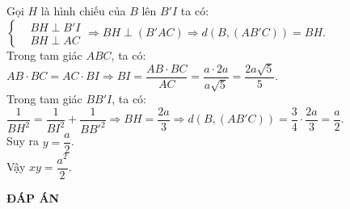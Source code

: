 \begin{ex}
{{
		}
		Gọi $H$ là hình chiếu của $B$ lên $B'I$ ta có:\\
		$\left\{\begin{aligned}& BH\perp B'I \\
		& BH\perp AC 
		\end{aligned}\right. \Rightarrow BH\perp \left(B'AC\right) \Rightarrow d\left(B,\left(AB'C\right)\right)=BH$.\\
		Trong tam giác $ABC$, ta có:\\
		$AB\cdot BC=AC\cdot BI \Rightarrow BI=\dfrac{AB\cdot BC}{AC}=\dfrac{a\cdot 2a}{a\sqrt{5}}=\dfrac{2a\sqrt{5}}{5}$.\\
		Trong tam giác $BB'I$, ta có:\\ $\dfrac{1}{BH^2}=\dfrac{1}{BI^2}+\dfrac{1}{BB'^2}\Rightarrow BH=\dfrac{2a}{3}\Rightarrow d\left(B,\left(AB'C\right)\right)=\dfrac{3}{4}\cdot \dfrac{2a}{3}=\dfrac{a}{2}$.\\
		Suy ra $y=\dfrac{a}{2}$.\\
		Vậy $xy=\dfrac{a^2}{2}$.
	}
\end{ex}

\newpage
\begin{center}
\textbf{ĐÁP ÁN}
\end{center}
\begin{multicols}{10}
 
\end{multicols}

